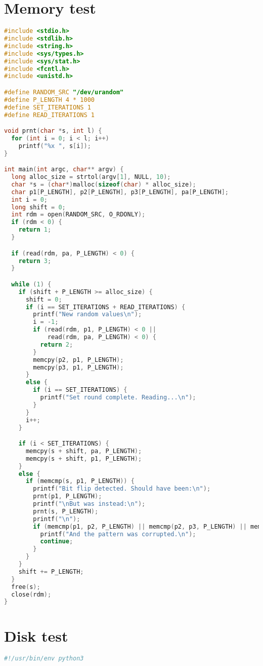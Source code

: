 \begin{appendices}

\section{Memory test}\label{Apdx-memory}
\begin{lstlisting}[language=C]
#include <stdio.h>
#include <stdlib.h>
#include <string.h>
#include <sys/types.h>
#include <sys/stat.h>
#include <fcntl.h>
#include <unistd.h>

#define RANDOM_SRC "/dev/urandom"
#define P_LENGTH 4 * 1000
#define SET_ITERATIONS 1
#define READ_ITERATIONS 1

void prnt(char *s, int l) {
  for (int i = 0; i < l; i++)
    printf("%x ", s[i]);
}

int main(int argc, char** argv) {
  long alloc_size = strtol(argv[1], NULL, 10);
  char *s = (char*)malloc(sizeof(char) * alloc_size);
  char p1[P_LENGTH], p2[P_LENGTH], p3[P_LENGTH], pa[P_LENGTH];
  int i = 0;
  long shift = 0;
  int rdm = open(RANDOM_SRC, O_RDONLY);
  if (rdm < 0) {
    return 1;
  }

  if (read(rdm, pa, P_LENGTH) < 0) {
    return 3;
  }

  while (1) {
    if (shift + P_LENGTH >= alloc_size) {
      shift = 0;
      if (i == SET_ITERATIONS + READ_ITERATIONS) {
        printf("New random values\n");
        i = -1;
        if (read(rdm, p1, P_LENGTH) < 0 ||
            read(rdm, pa, P_LENGTH) < 0) {
          return 2;
        }
        memcpy(p2, p1, P_LENGTH);
        memcpy(p3, p1, P_LENGTH);
      }
      else {
        if (i == SET_ITERATIONS) {
          printf("Set round complete. Reading...\n");
        }
      }
      i++;
    }

    if (i < SET_ITERATIONS) {
      memcpy(s + shift, pa, P_LENGTH);
      memcpy(s + shift, p1, P_LENGTH);
    }
    else {
      if (memcmp(s, p1, P_LENGTH)) {
        printf("Bit flip detected. Should have been:\n");
        prnt(p1, P_LENGTH);
        printf("\nBut was instead:\n");
        prnt(s, P_LENGTH);
        printf("\n");
        if (memcmp(p1, p2, P_LENGTH) || memcmp(p2, p3, P_LENGTH) || memcmp(p1, p3, P_LENGTH)) {
          printf("And the pattern was corrupted.\n");
          continue;
        }
      }
    }
    shift += P_LENGTH;
  }
  free(s);
  close(rdm);
}
\end{lstlisting}

\section{Disk test}\label{Apdx-disk}
\begin{lstlisting}[language=Python]
#!/usr/bin/env python3


\end{lstlisting}
\end{appendices}
